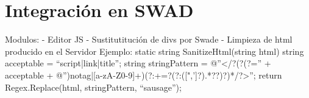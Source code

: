 \chapter{Integración en SWAD}

Modulos:
- Editor JS
- Sustitutitución de divs por Swade
- Limpieza de html producido en el Servidor
Ejemplo:
static string SanitizeHtml(string html)
{
    string acceptable = ``script|link|title'';
    string stringPattern = @''</?(?(?='' + acceptable + @'')notag|[a-zA-Z0-9]+)(?:\s[a-zA-Z0-9\-]+=?(?:([",']?).*?\1?)?)*\s*/?>'';
    return Regex.Replace(html, stringPattern, ``sausage'');
}
